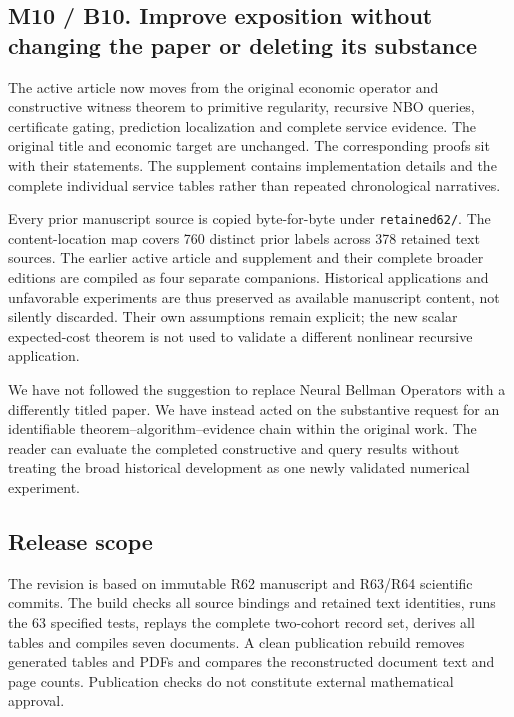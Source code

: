 \hypertarget{m10-b10.-improve-exposition-without-changing-the-paper-or-deleting-its-substance}{%
\subsection{M10 / B10. Improve exposition without changing the paper or
deleting its
substance}\label{m10-b10.-improve-exposition-without-changing-the-paper-or-deleting-its-substance}}

The active article now moves from the original economic operator and
constructive witness theorem to primitive regularity, recursive NBO
queries, certificate gating, prediction localization and complete
service evidence. The original title and economic target are unchanged.
The corresponding proofs sit with their statements. The supplement
contains implementation details and the complete individual service
tables rather than repeated chronological narratives.

Every prior manuscript source is copied byte-for-byte under
\texttt{retained62/}. The content-location map covers 760 distinct prior
labels across 378 retained text sources. The earlier active article and
supplement and their complete broader editions are compiled as four
separate companions. Historical applications and unfavorable experiments
are thus preserved as available manuscript content, not silently
discarded. Their own assumptions remain explicit; the new scalar
expected-cost theorem is not used to validate a different nonlinear
recursive application.

We have not followed the suggestion to replace Neural Bellman Operators
with a differently titled paper. We have instead acted on the
substantive request for an identifiable theorem--algorithm--evidence
chain within the original work. The reader can evaluate the completed
constructive and query results without treating the broad historical
development as one newly validated numerical experiment.

\hypertarget{release-scope}{%
\subsection{Release scope}\label{release-scope}}

The revision is based on immutable R62 manuscript and R63/R64 scientific
commits. The build checks all source bindings and retained text
identities, runs the 63 specified tests, replays the complete two-cohort
record set, derives all tables and compiles seven documents. A clean
publication rebuild removes generated tables and PDFs and compares the
reconstructed document text and page counts. Publication checks do not
constitute external mathematical approval.

